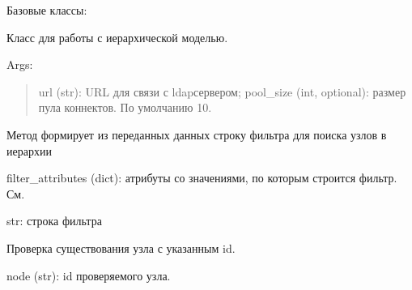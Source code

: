 \documentclass[a4paper,10pt,russian]{sphinxmanual}
\begin{document}
\begin{fulllineitems}

\pysigstartsignatures
{}
\pysigstopsignatures
\sphinxAtStartPar
Базовые классы: 

\sphinxAtStartPar
Класс для работы с иерархической моделью.

\sphinxAtStartPar
Args:
\begin{quote}

\sphinxAtStartPar
url (str): URL для связи с ldap\sphinxhyphen{}сервером;
pool\_size (int, optional): размер пула коннектов. По умолчанию \sphinxhyphen{} 10.
\end{quote}


\begin{fulllineitems}

\pysigstartsignatures
{}
\pysigstopsignatures
\sphinxAtStartPar
Метод формирует из переданных данных строку фильтра для поиска узлов
в иерархии
\begin{description}
\sphinxAtStartPar
filter\_attributes (dict): атрибуты со значениями, по которым
строится фильтр.
См. 

\sphinxAtStartPar
str: строка фильтра

\end{description}

\end{fulllineitems}



\begin{fulllineitems}

\pysigstartsignatures
{}
\pysigstopsignatures
\sphinxAtStartPar
Проверка существования узла с указанным id.
\begin{description}
\sphinxAtStartPar
node (str): id проверяемого узла.


\end{description}
\end{fulllineitems}
\end{fulllineitems}
\end{document}
